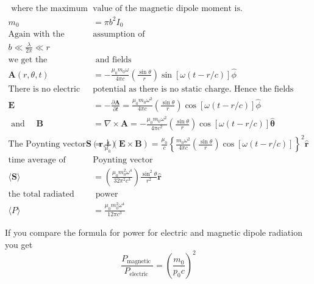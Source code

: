 \begin{align*}
\text{ where the maximum }&\text{value of the magnetic dipole moment is.}\\
m_{0}&=\pi b^{2} I_{0}\\
\text{Again with the }&\text{assumption of}\\
b \ll \frac{\lambda}{2 \pi} \ll r\\
\text{we get the potentials }&\text{ and fields}\\
\mathbf{A}(r, \theta, t)&=-\frac{\mu_{0} m_{0} \omega}{4 \pi c}\left(\frac{\sin \theta}{r}\right) \sin [\omega(t-r / c)] \hat{\phi}\\
\text{There is no electric scalar }&\text{potential as there is no static charge. Hence the fields}\\
\mathbf{E}&=-\frac{\partial \mathbf{A}}{\partial t}=\frac{\mu_{0} m_{0} \omega^{2}}{4 \pi c}\left(\frac{\sin \theta}{r}\right) \cos [\omega(t-r / c)] \hat{\phi}\\
\text{ and }\quad
\mathbf{B}&=\nabla \times \mathbf{A}=-\frac{\mu_{0} m_{0} \omega^{2}}{4 \pi c^{2}}\left(\frac{\sin \theta}{r}\right) \cos [\omega(t-r / c)] \hat{\boldsymbol{\theta}}\\
\text{The Poynting vector }
\mathbf{S}(\mathbf{r}, t)&=\frac{1}{\mu_{0}}(\mathbf{E} \times \mathbf{B})=\frac{\mu_{0}}{c}\left\{\frac{m_{0} \omega^{2}}{4 \pi c}\left(\frac{\sin \theta}{r}\right) \cos [\omega(t-r / c)]\right\}^{2} \hat{\mathbf{r}}\\
\text{time average of }&\text{Poynting vector}\\
\langle\mathbf{S}\rangle&=\left(\frac{\mu_{0} m_{0}^{2} \omega^{4}}{32 \pi^{2} c^{3}}\right) \frac{\sin ^{2} \theta}{r^{2}} \hat{\mathbf{r}}\\
\text{the total radiated}&\text{ power}\\
\langle P\rangle&=\frac{\mu_{0} m_{0}^{2} \omega^{4}}{12 \pi c^{3}}
\end{align*}
 \begin{note}
 	If you compare the formula for power for electric and magnetic dipole radiation you get
 	$$\frac{P_{\text {magnetic }}}{P_{\text {electric }}}=\left(\frac{m_{0}}{p_{0} c}\right)^{2}$$
 \end{note}
 
